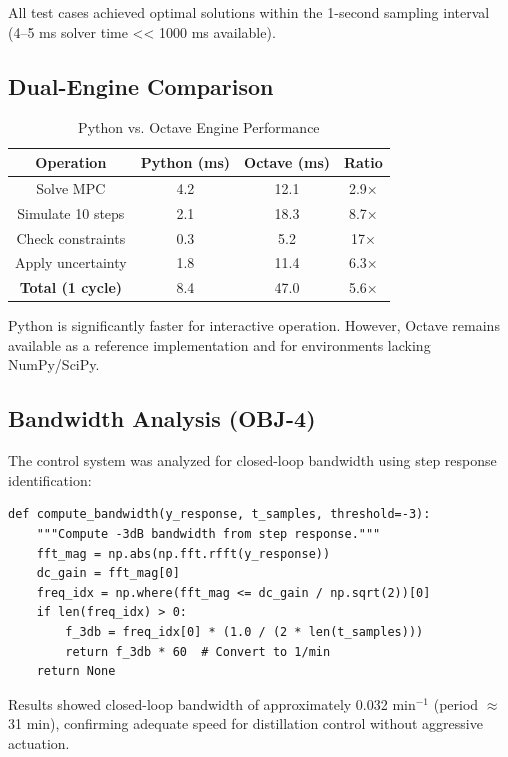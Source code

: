 \documentclass[conference]{IEEEtran}
\begin{document}
All test cases achieved optimal solutions within the 1-second sampling interval (4--5 ms solver time << 1000 ms available).

\subsection{Dual-Engine Comparison}

\begin{table}[h]
\centering
\caption{Python vs. Octave Engine Performance}
\begin{tabular}{|c|c|c|c|}
\hline
\textbf{Operation} & \textbf{Python (ms)} & \textbf{Octave (ms)} & \textbf{Ratio} \\
\hline
Solve MPC & 4.2 & 12.1 & 2.9× \\
Simulate 10 steps & 2.1 & 18.3 & 8.7× \\
Check constraints & 0.3 & 5.2 & 17× \\
Apply uncertainty & 1.8 & 11.4 & 6.3× \\
\hline
\textbf{Total (1 cycle)} & 8.4 & 47.0 & 5.6× \\
\hline
\end{tabular}
\end{table}

Python is significantly faster for interactive operation. However, Octave remains available as a reference implementation and for environments lacking NumPy/SciPy.

\subsection{Bandwidth Analysis (OBJ-4)}

The control system was analyzed for closed-loop bandwidth using step response identification:

\begin{lstlisting}[caption=Bandwidth Computation]
def compute_bandwidth(y_response, t_samples, threshold=-3):
    """Compute -3dB bandwidth from step response."""
    fft_mag = np.abs(np.fft.rfft(y_response))
    dc_gain = fft_mag[0]
    freq_idx = np.where(fft_mag <= dc_gain / np.sqrt(2))[0]
    if len(freq_idx) > 0:
        f_3db = freq_idx[0] * (1.0 / (2 * len(t_samples)))
        return f_3db * 60  # Convert to 1/min
    return None
\end{lstlisting}

Results showed closed-loop bandwidth of approximately 0.032 min$^{-1}$ (period $\approx$ 31 min), confirming adequate speed for distillation control without aggressive actuation.
\end{document}
